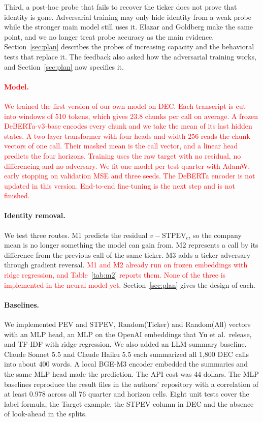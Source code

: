 \documentclass{article}
\newcommand{\new}[1]{\textcolor{red}{#1}}
\begin{document}
Third, a post-hoc probe that fails to recover the ticker does not prove that identity is gone. Adversarial training may only hide identity from a weak probe while the stronger main model still uses it. Elazar and Goldberg \cite{elazar-goldberg-2018-adversarial} make the same point, and we no longer treat probe accuracy as the main evidence. Section~\ref{sec:plan} describes the probes of increasing capacity and the behavioral tests that replace it. The feedback also asked how the adversarial training works, and Section~\ref{sec:plan} now specifies it.

\paragraph{\new{Model.}}
\new{We trained the first version of our own model on DEC. Each transcript is cut into windows of 510 tokens, which gives 23.8 chunks per call on average. A frozen DeBERTa-v3-base encodes every chunk and we take the mean of its last hidden states. A two-layer transformer with four heads and width 256 reads the chunk vectors of one call. Their masked mean is the call vector, and a linear head predicts the four horizons. Training uses the raw target with no residual, no differencing and no adversary. We fit one model per test quarter with AdamW, early stopping on validation MSE and three seeds. The DeBERTa encoder is not updated in this version. End-to-end fine-tuning is the next step and is not finished.}

\paragraph{Identity removal.}
We test three routes. M1 predicts the residual $v-\mathrm{STPEV}_c$, so the company mean is no longer something the model can gain from. M2 represents a call by its difference from the previous call of the same ticker. M3 adds a ticker adversary through gradient reversal. \new{M1 and M2 already run on frozen embeddings with ridge regression, and Table~\ref{tab:m2} reports them. None of the three is implemented in the neural model yet.} Section~\ref{sec:plan} gives the design of each.

\paragraph{Baselines.}
We implemented PEV and STPEV, Random(Ticker) and Random(All) vectors with an MLP head, an MLP on the OpenAI embeddings that Yu et al.\ release, and TF-IDF with ridge regression. We also added an LLM-summary baseline. Claude Sonnet 5.5 and Claude Haiku 5.5 each summarized all 1,800 DEC calls into about 400 words. A local BGE-M3 encoder embedded the summaries and the same MLP head made the prediction. The API cost was 44 dollars. The MLP baselines reproduce the result files in the authors' repository with a correlation of at least 0.978 across all 76 quarter and horizon cells. Eight unit tests cover the label formula, the Target example, the STPEV column in DEC and the absence of look-ahead in the splits.
\end{document}
